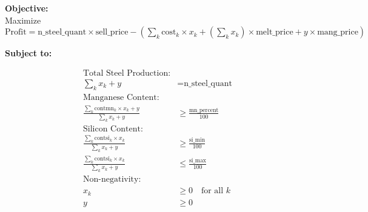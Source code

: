 \documentclass{article}
\begin{document}
\textbf{Objective:} \\
Maximize \(\text{Profit} = \text{n\_steel\_quant} \times \text{sell\_price} - \left(\sum_{k} \text{cost}_{k} \times x_k + \left(\sum_{k} x_k\right) \times \text{melt\_price} + y \times \text{mang\_price}\right)\)

\textbf{Subject to:}

\begin{align*}
\text{Total Steel Production:} & \\
\sum_{k} x_k + y &= \text{n\_steel\_quant} \\

\text{Manganese Content:} & \\
\frac{\sum_{k} \text{contmn}_{k} \times x_k + y}{\sum_{k} x_k + y} &\geq \frac{\text{mn\_percent}}{100} \\

\text{Silicon Content:} & \\
\frac{\sum_{k} \text{contsi}_{k} \times x_k}{\sum_{k} x_k + y} &\geq \frac{\text{si\_min}}{100} \\
\frac{\sum_{k} \text{contsi}_{k} \times x_k}{\sum_{k} x_k + y} &\leq \frac{\text{si\_max}}{100} \\

\text{Non-negativity:} & \\
x_k &\geq 0 \quad \text{for all } k \\
y &\geq 0
\end{align*}
\end{document}
